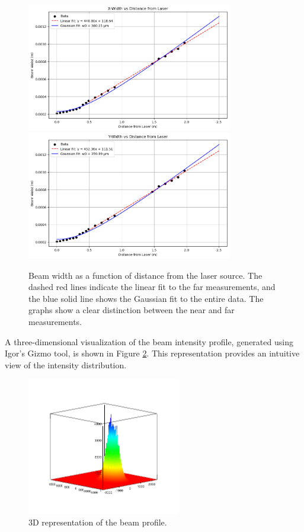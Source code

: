 \documentclass[12pt]{article}
\begin{document}
\begin{figure} [H]
    \centering
    \includegraphics[width=0.8\textwidth]{o1.png}
    \includegraphics[width=0.8\textwidth]{o2.png}
    \caption{Beam width as a function of distance from the laser source. The dashed red lines indicate the linear fit to the far measurements, and the blue solid line shows the Gaussian fit to the entire data. The graphs show a clear distinction between the near and far measurements. }
    \label{fig:beam_divergence}
\end{figure}

A three-dimensional visualization of the beam intensity profile, generated using Igor's Gizmo tool, is shown in Figure \ref{fig:3d_beam}. This representation provides an intuitive view of the intensity distribution.

\begin{figure} [H]
    \centering
    \includegraphics[width=0.6\textwidth]{Lab 3 Gizmo.png}
    \caption{3D representation of the beam profile.}
    \label{fig:3d_beam}
\end{figure}
\end{document}
